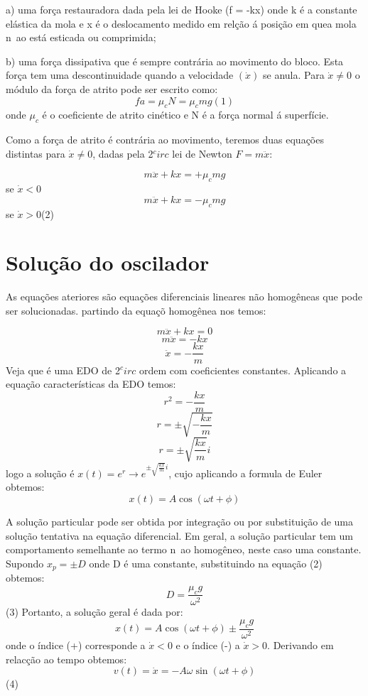 \documentclass[a4paper]{article} %
\begin{document}
a) uma for\c{c}a restauradora dada pela lei de Hooke (f = -kx) onde k \'e a constante el\'astica da mola e x \'e o deslocamento medido em rel\c{c}\~ao \'a posi\c{c}\~ao em quea mola n~ao est\'a esticada ou comprimida;

b) uma for\c{c}a dissipativa que \'e sempre contr\'aria ao movimento do bloco. Esta for\c{c}a tem uma descontinuidade quando a velocidade $(\dot{x})$ se anula. Para $\dot{x} \neq 0$ o m\'odulo da for\c{c}a de atrito pode ser escrito como:
\[fa = \mu_cN = \mu_cmg (1)\]
onde $\mu_c$ \'e o coeficiente de atrito cin\'etico e N \'e a for\c{c}a normal \'a superf\'icie.

Como a for\c{c}a de atrito \'e contr\'aria ao movimento, teremos duas equa\c{c}\~oes distintas para $\dot{x} \neq 0$, dadas pela 2$^circ$ lei de Newton $F = m\ddot{x}$:

\[m\ddot{x} + kx = + \mu_cmg\] se $\dot{x} < 0$
\[m\ddot{x} + kx = - \mu_cmg\] se $\dot{x} > 0$(2)

\section{Solu\c{c}\~ao do oscilador}

As equa\c{c}\~oes ateriores s\~ao equa\c{c}\~oes diferenciais lineares n\~ao homog\^eneas que pode ser solucionadas.
partindo da equa\c{c}\~o homog\^enea nos temos:

\[m\ddot{x} + kx = 0\]
\[m\ddot{x} = - kx\]
\[\ddot{x} = -\frac{kx}{m}\]
Veja que \'e uma EDO de 2$^circ$ ordem com coeficientes constantes. Aplicando a equa\c{c}\~ao caracter\'isticas da EDO temos:
\[r^2 = -\frac{kx}{m}\] 
\[r = \pm \sqrt{-\frac{kx}{m}}\]
\[r = \pm \sqrt{\frac{kx}{m}}i\]
logo a solu\c{c}\~ao \'e $x(t) = e^r \rightarrow e^{\pm \sqrt{\frac{kx}{m}}i}$, cujo aplicando a formula de Euler obtemos:
\[x(t) = A\cos(\omega{t} + \phi)\]

A solu\c{c}\~ao particular pode ser obtida por integra\c{c}\~ao ou por substitui\c{c}\~ao de uma solu\c{c}\~ao tentativa na equa\c{c}\~ao diferencial. Em geral, a solu\c{c}\~ao particular tem um comportamento semelhante ao termo n~ao homog\^eneo, neste caso uma constante. Supondo $x_p = \pm D$ onde D \'e uma constante, substituindo na equa\c{c}\~ao (2) obtemos:
\[D = \frac{\mu_cg}{\omega^2}\] (3)
Portanto, a solu\c{c}\~ao geral \'e dada por:
\[x(t) = A\cos(\omega{t} + \phi) \pm \frac{\mu_cg}{\omega^2}\]
onde o \'indice (+) corresponde a $\dot{x} < 0$ e o \'indice (-) a $\dot{x} > 0$. Derivando em relac\c{c}\~ao ao tempo obtemos:
\[v(t) = \dot{x} = -A\omega\sin(\omega{t} + \phi) \](4)
\end{document}
